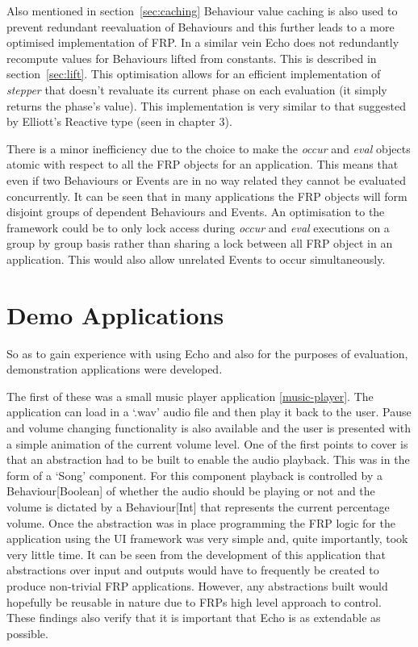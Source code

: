     Also mentioned in section~\ref{sec:caching} Behaviour value caching is also used to prevent redundant reevaluation of 
    Behaviours
    and this further leads to a more optimised implementation of FRP. In a similar vein Echo does not redundantly recompute
    values for Behaviours lifted from constants. This is described in section~\ref{sec:lift}. This optimisation 
    allows for an efficient implementation of \emph{stepper} that
    doesn't revaluate its current phase on each evaluation (it simply returns the phase's value). This implementation is
    very similar to that suggested by Elliott's Reactive type (seen in chapter 3).
    
    There is a minor inefficiency due to the choice to make the \emph{occur} and \emph{eval} objects atomic
    with respect to all the FRP objects for an application. This means that even if two Behaviours or Events are in no way
    related they cannot be evaluated concurrently. It can be seen that in many applications the FRP objects will
    form disjoint groups of dependent Behaviours and Events. An optimisation to the framework could be to
    only lock access during \emph{occur} and \emph{eval} executions on a group by group basis rather than sharing
    a lock between all FRP object in an application. This would also allow unrelated Events to occur simultaneously.
  
  \section{Demo Applications}
    So as to gain experience with using Echo and also for the purposes of evaluation, demonstration
    applications were developed. 
    
    The first of these was a small music player application \ref{music-player}. The application
    can load in a `.wav' audio file and then play it back to the user. Pause and volume changing functionality
    is also available and the user is presented with a simple animation of the current volume level. One of the
    first points to cover is that an abstraction had to be built to enable the audio playback. This was in the form
    of a `Song' component. For this component playback is controlled by a Behaviour[Boolean] of whether the audio
    should be playing or not and the volume is dictated by a Behaviour[Int] that represents the current percentage
    volume. Once the abstraction was in place programming the FRP logic for the application using the 
    UI framework was very simple and, quite importantly, took very little time. It can be seen from
    the development of this application that abstractions over input and outputs would have to frequently be
    created to produce non-trivial FRP applications. However, any abstractions built would hopefully be
    reusable in nature due to FRPs high level approach to control. These findings also verify that it
    is important that Echo is as extendable as possible.
    
